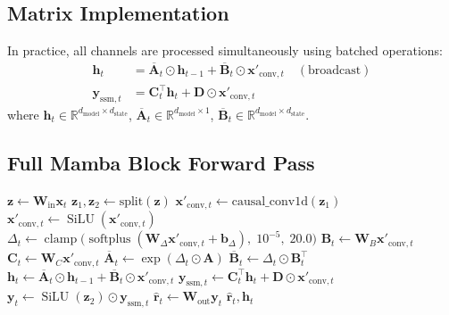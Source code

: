 \documentclass[11pt,a4paper]{article}
\newcommand{\R}{\mathbb{R}}
\newcommand{\softplus}{\operatorname{softplus}}
\newcommand{\SiLU}{\operatorname{SiLU}}
\begin{document}
\subsection{Matrix Implementation}

In practice, all channels are processed simultaneously using batched operations:
\begin{align}
  \mathbf{h}_t &= \overline{\mathbf{A}}_t \odot \mathbf{h}_{t-1} + \overline{\mathbf{B}}_t \odot \mathbf{x}'_{\text{conv},t} \quad (\text{broadcast}) \\
  \mathbf{y}_{\text{ssm},t} &= \mathbf{C}_t^\top \mathbf{h}_t + \mathbf{D} \odot \mathbf{x}'_{\text{conv},t}
\end{align}
where $\mathbf{h}_t \in \R^{d_{\text{model}} \times d_{\text{state}}}$,
$\overline{\mathbf{A}}_t \in \R^{d_{\text{model}} \times 1}$,
$\overline{\mathbf{B}}_t \in \R^{d_{\text{model}} \times d_{\text{state}}}$.

\subsection{Full Mamba Block Forward Pass}

\begin{algorithm}[h]
\caption{Mamba block forward pass (per time step $t$)}
\begin{algorithmic}[1]
\STATE $\mathbf{z} \gets \mathbf{W}_{\text{in}} \mathbf{x}_t$ 
\STATE $\mathbf{z}_1, \mathbf{z}_2 \gets \text{split}(\mathbf{z})$ 
\STATE $\mathbf{x}'_{\text{conv},t} \gets \text{causal\_conv1d}(\mathbf{z}_1)$ 
\STATE $\mathbf{x}'_{\text{conv},t} \gets \SiLU(\mathbf{x}'_{\text{conv},t})$ 
\STATE $\Delta_t \gets \operatorname{clamp}\bigl(\softplus(\mathbf{W}_\Delta \mathbf{x}'_{\text{conv},t} + \mathbf{b}_\Delta),\; 10^{-5},\; 20.0\bigr)$ 
\STATE $\mathbf{B}_t \gets \mathbf{W}_B \mathbf{x}'_{\text{conv},t}$ 
\STATE $\mathbf{C}_t \gets \mathbf{W}_C \mathbf{x}'_{\text{conv},t}$ 
\STATE $\overline{\mathbf{A}}_t \gets \exp(\Delta_t \odot \mathbf{A})$ 
\STATE $\overline{\mathbf{B}}_t \gets \Delta_t \odot \mathbf{B}_t^\top$ 
\STATE $\mathbf{h}_t \gets \overline{\mathbf{A}}_t \odot \mathbf{h}_{t-1} + \overline{\mathbf{B}}_t \odot \mathbf{x}'_{\text{conv},t}$ 
\STATE $\mathbf{y}_{\text{ssm},t} \gets \mathbf{C}_t^\top \mathbf{h}_t + \mathbf{D} \odot \mathbf{x}'_{\text{conv},t}$ 
\STATE $\mathbf{y}_t \gets \SiLU(\mathbf{z}_2) \odot \mathbf{y}_{\text{ssm},t}$ 
\STATE $\mathbf{\hat{r}}_t \gets \mathbf{W}_{\text{out}} \mathbf{y}_t$ 
\STATE \RETURN $\mathbf{\hat{r}}_t, \mathbf{h}_t$
\end{algorithmic}
\end{algorithm}
\end{document}
